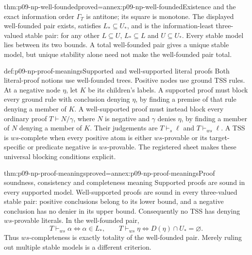 \begin{hbtheorem}{thm:p09-np-well-founded}{proved=annex:p09-np-well-founded}{Existence and the exact information order}
\(\Gamma_T\) is antitone; its square is monotone. The displayed
well-founded pair exists, satisfies \(L_*\subseteq U_*\), and
is the information-least three-valued stable pair: for any other
\(L\subseteq U\), \(L_*\subseteq L\) and \(U\subseteq U_*\).
Every stable model lies between its two bounds. A total well-founded
pair gives a unique stable model, but unique stability alone need
not make the well-founded pair total.
\end{hbtheorem}

\begin{hbdefinition}{def:p09-np-proof-meanings}{Supported and well-supported literal proofs}
Both literal-proof notions use well-founded trees. Positive nodes use
ground TSS rules. At a negative node \(\eta\), let \(K\) be
its children's labels. A supported proof must block every ground
rule with conclusion denying \(\eta\), by finding a premise of
that rule denying a member of \(K\). A well-supported proof must
instead block every ordinary proof \(T\vdash N/\gamma\), where
\(N\) is negative and \(\gamma\) denies \(\eta\), by finding
a member of \(N\) denying a member of \(K\).
Their judgements are \(T\vdash_s\ell\) and
\(T\vdash_{ws}\ell\). A TSS is \(ws\)-complete when every
positive atom is either \(ws\)-provable or its target-specific
or predicate negative is \(ws\)-provable. The registered sheet
makes these universal blocking conditions explicit.
\end{hbdefinition}

\begin{hbtheorem}{thm:p09-np-proof-meanings}{proved=annex:p09-np-proof-meanings}{Proof soundness, consistency and completeness meaning}
Supported proofs are sound in every supported model.
Well-supported proofs are sound in every three-valued stable pair:
positive conclusions belong to its lower bound, and a negative
conclusion has no denier in its upper bound. Consequently no TSS
has denying \(ws\)-provable literals. In the well-founded pair,
\[
 T\vdash_{ws}\alpha\iff\alpha\in L_*,\qquad
 T\vdash_{ws}\eta\iff D(\eta)\cap U_*=\varnothing.
\]
Thus \(ws\)-completeness is exactly totality of the well-founded
pair. Merely ruling out multiple stable models is a different criterion.
\end{hbtheorem}

